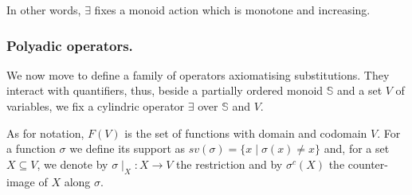 \documentclass[preprint,12pt]{elsarticle}
\newtheorem{remark}{Remark}
\def\monid{{\mathbf 0}}
\def\monid{\mathbf{1}}
\begin{document}
In other words, $\exists$ fixes a monoid action which is monotone and increasing.

%
%
%
%


\subsubsection{Polyadic operators.}
We now move to define a family of operators axiomatising substitutions.  
They interact with quantifiers, thus, beside a partially ordered monoid $\mathbb{S}$
and a set $V$ of variables, we fix a cylindric operator $\exists$ over ${\mathbb S}$ and $V$.

As for notation, $F(V)$ is the set of functions with domain and codomain $V$.
For a function $\sigma$ %
we define its support as $sv(\sigma) = \{x \mid \sigma(x) \neq x\}$
and, for a set $X \subseteq V$, we denote by 
$\sigma \mid_{X}: X \rightarrow V$ the restriction and
by $\sigma^{c}(X)$ the counter-image of $X$ along $\sigma$.
\end{document}
